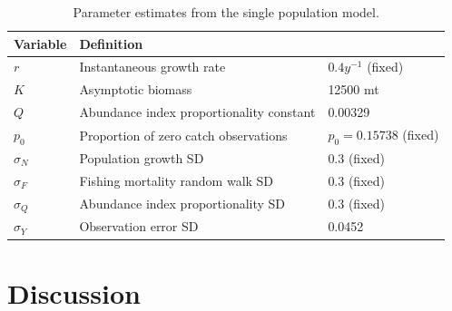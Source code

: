 \documentclass[12pt,letterpaper,twoside]{article}
\begin{document}
\begin{table}
\caption{Parameter estimates from the single population model.
\label{tab:allvars1}}
\begin{center}
\begin{tabular}{lll}
\hline
Variable & Definition\\
\hline
$r$ & Instantaneous growth rate & $0.4 y^{-1}$ (fixed)\\
$K$ & Asymptotic biomass & 12500 mt \\
$Q$ & Abundance index proportionality constant & 0.00329\\
$p_0$ & Proportion of zero catch observations & $p_0 = 0.15738$ (fixed)\\
\hline
$\sigma_N$ & Population growth SD & 0.3 (fixed)\\
$\sigma_F$ & Fishing mortality random walk SD & 0.3 (fixed)\\
$\sigma_Q$ & Abundance index proportionality SD & 0.3 (fixed)\\
$\sigma_Y$ & Observation error SD & 0.0452 \\
\hline
\end{tabular}
\end{center}
\end{table}

\section{Discussion}
\end{document}
